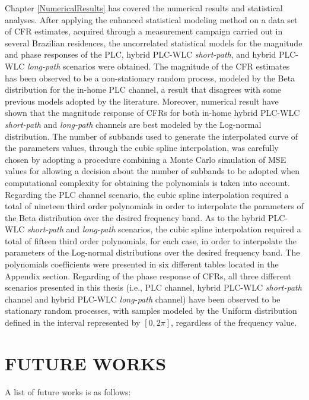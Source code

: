 Chapter \ref{NumericalResults} has covered the numerical results and statistical analyses. After applying the enhanced statistical modeling method on a data set of \ac{CFR} estimates, acquired through a measurement campaign carried out in several Brazilian residences, the uncorrelated statistical models for the magnitude and phase responses of the \ac{PLC}, hybrid \ac{PLC}-\ac{WLC} \textit{short-path}, and hybrid \ac{PLC}-\ac{WLC} \textit{long-path} scenarios were obtained. The magnitude of the \ac{CFR} estimates has been observed to be a non-stationary random process, modeled by the Beta distribution for the in-home \ac{PLC} channel, a result that disagrees with some previous models adopted by the literature. Moreover, numerical result have shown that the magnitude response of \acp{CFR} for both in-home hybrid \ac{PLC}-\ac{WLC} \textit{short-path} and \textit{long-path} channels are best modeled by the Log-normal distribution. The number of subbands used to generate the interpolated curve of the parameters values, through the cubic spline interpolation, was carefully chosen by adopting a procedure combining a Monte Carlo simulation of \ac{MSE} values for allowing a decision about the  number of subbands to be adopted when computational complexity for obtaining the polynomials is taken into account. Regarding the \ac{PLC} channel scenario, the cubic spline interpolation required a total of nineteen third order polynomials in order to interpolate the parameters of the Beta distribution over the desired frequency band. As to the hybrid \ac{PLC}-\ac{WLC} \textit{short-path} and \textit{long-path} scenarios, the cubic spline interpolation required a total of fifteen third order polynomials, for each case, in order to interpolate the parameters of the Log-normal distributions over the desired frequency band. The polynomials coefficients were presented in six different tables located in the Appendix section. Regarding of the phase response of \acp{CFR}, all three different scenarios presented in this thesis (i.e., \ac{PLC} channel, hybrid \ac{PLC}-{WLC} \textit{short-path} channel and hybrid \ac{PLC}-{WLC} \textit{long-path} channel) have been observed to be stationary random processes,  with samples modeled by the Uniform distribution defined in the interval represented by $[0,2\pi]$, regardless of the frequency value. 

\section{FUTURE WORKS}  \label{FW}
A list of future works is as follows:

